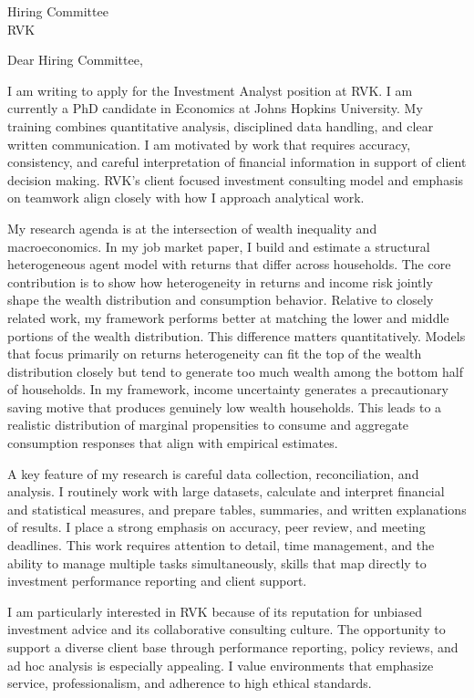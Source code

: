 \documentclass[11pt]{letter}
\begin{document}
\begin{letter}{Hiring Committee \\ RVK}

\opening{Dear Hiring Committee,}

I am writing to apply for the Investment Analyst position at RVK. I am currently a PhD candidate in Economics at Johns Hopkins University. My training combines quantitative analysis, disciplined data handling, and clear written communication. I am motivated by work that requires accuracy, consistency, and careful interpretation of financial information in support of client decision making. RVK’s client focused investment consulting model and emphasis on teamwork align closely with how I approach analytical work.

My research agenda is at the intersection of wealth inequality and macroeconomics. In my job market paper, I build and estimate a structural heterogeneous agent model with returns that differ across households. The core contribution is to show how heterogeneity in returns and income risk jointly shape the wealth distribution and consumption behavior. Relative to closely related work, my framework performs better at matching the lower and middle portions of the wealth distribution. This difference matters quantitatively. Models that focus primarily on returns heterogeneity can fit the top of the wealth distribution closely but tend to generate too much wealth among the bottom half of households. In my framework, income uncertainty generates a precautionary saving motive that produces genuinely low wealth households. This leads to a realistic distribution of marginal propensities to consume and aggregate consumption responses that align with empirical estimates.

A key feature of my research is careful data collection, reconciliation, and analysis. I routinely work with large datasets, calculate and interpret financial and statistical measures, and prepare tables, summaries, and written explanations of results. I place a strong emphasis on accuracy, peer review, and meeting deadlines. This work requires attention to detail, time management, and the ability to manage multiple tasks simultaneously, skills that map directly to investment performance reporting and client support.

I am particularly interested in RVK because of its reputation for unbiased investment advice and its collaborative consulting culture. The opportunity to support a diverse client base through performance reporting, policy reviews, and ad hoc analysis is especially appealing. I value environments that emphasize service, professionalism, and adherence to high ethical standards.


\end{letter}
\end{document}
